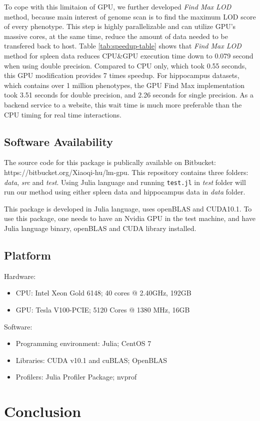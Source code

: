 \documentclass[9pt,twocolumn,twoside,lineno]{gsag3jnl}
\newcommand{\code}{\texttt}
\begin{document}
To cope with this limitaion of GPU, we further developed \textit{Find Max LOD} method, because main interest of genome scan is to find the maximum LOD score of every phenotype. 
This step is highly parallelizable and can utilize GPU's massive cores, at the same time, reduce the amount of data needed to be transfered back to host. 
Table \ref{tab:speedup-table} shows that \textit{Find Max LOD} method for spleen data reduces CPU\&GPU execution time down to 0.079 second when using double precision. 
Compared to CPU only, which took 0.55 seconds, this GPU modification provides 7 times speedup. 
For hippocampus datasets, which contains over 1 million phenotypes, the GPU Find Max implementation took 3.51 seconds for double precision, and 2.26 seconds for single precision. 
As a backend service to a website, this wait time is much more preferable than the CPU timing for real time interactions. 

\subsection{Software Availability}
The source code for this package is publically available on Bitbucket: https://bitbucket.org/Xiaoqi-hu/lm-gpu.
This repository contains three folders: \textit{data}, \textit{src} and \textit{test}. 
Using Julia language and running \code{test.jl} in \textit{test} folder will run our method using either spleen data and hippocampus data in \textit{data} folder. 

This package is developed in Julia language, uses openBLAS and CUDA10.1. 
To use this package, one needs to have an Nvidia GPU in the test machine,
and have Julia language binary, openBLAS and CUDA library installed. 

\subsection{Platform}
Hardware:
 \begin{itemize}
	\item CPU: Intel Xeon Gold 6148; 40 cores @ 2.40GHz, 192GB 
	\item GPU: Tesla V100-PCIE; 5120 Cores @ 1380 MHz, 16GB
\end{itemize}
Software: 
\begin{itemize}
	\item Programming environment: Julia; CentOS 7
	\item Libraries: CUDA v10.1 and cuBLAS; OpenBLAS
	\item Profilers: Julia Profiler Package; nvprof
\end{itemize}

\section{Conclusion}



\end{document}
